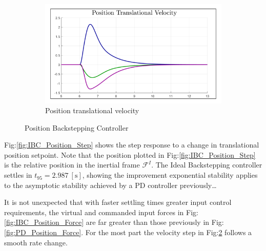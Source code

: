 \begin{figure}[hbtp]
\begin{subfigure}{0.49\textwidth}
\centering
\includegraphics[width=\textwidth]{graphs/IBC_Position_Velocity}
\caption{Position translational velocity}
\label{fig:IBC_Position_Velocity}
\end{subfigure}
\caption{Position Backstepping Controller}
\end{figure}
\par
Fig:\ref{fig:IBC_Position_Step} shows the step response to a change in translational position setpoint. Note that the position plotted in Fig:\ref{fig:IBC_Position_Step} is the relative position in the inertial frame $\mathcal{F}^{I}$. The Ideal Backstepping controller settles in $t_{95}=2.987~[\text{s}]$, showing the improvement exponential stability applies to the asymptotic stability achieved by a PD controller previously\ldots
\par
It is not unexpected that with faster settling times greater input control requirements, the virtual and commanded input forces in Fig:\ref{fig:IBC_Position_Force} are far greater than those previously in Fig:\ref{fig:PD_Position_Force}. For the most part the velocity step in Fig:\ref{fig:IBC_Position_Velocity} follows a smooth rate change.
